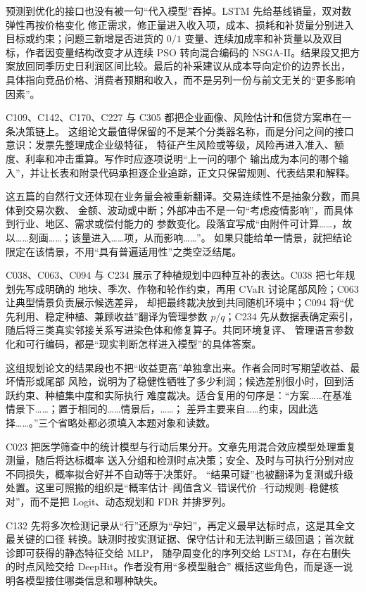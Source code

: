 \documentclass[UTF8,a4paper,12pt]{ctexart}
\begin{document}
预测到优化的接口也没有被一句“代入模型”吞掉。LSTM 先给基线销量，双对数弹性再按价格变化
修正需求，修正量进入收入项，成本、损耗和补货量分别进入目标或约束；问题三新增是否进货的
$0/1$ 变量、连续加成率和补货量以及双目标，作者因变量结构改变才从连续 PSO 转向混合编码的
NSGA-II。结果段又把方案放回同季历史日利润区间比较。最后的补采建议从成本导向定价的边界长出，
具体指向竞品价格、消费者预期和收入，而不是另列一份与前文无关的“更多影响因素”。

C109、C142、C170、C227 与 C305 都把企业画像、风险估计和信贷方案串在一条决策链上。
这组论文最值得保留的不是某个分类器名称，而是分问之间的接口意识：发票先整理成企业级特征，
特征产生风险或等级，风险再进入准入、额度、利率和冲击重算。写作时应逐项说明“上一问的哪个
输出成为本问的哪个输入”，并让长表和附录代码承担逐企业追踪，正文只保留规则、代表结果和解释。

这五篇的自然行文还体现在业务量会被重新翻译。交易连续性不是抽象分数，而具体到交易次数、
金额、波动或中断；外部冲击不是一句“考虑疫情影响”，而具体到行业、地区、需求或偿付能力的
参数变化。段落宜写成“由附件可计算……，故以……刻画……；该量进入……项，从而影响……”。
如果只能给单一情景，就把结论限定在该情景，不用“具有普遍适用性”之类空泛结尾。

C038、C063、C094 与 C234 展示了种植规划中四种互补的表达。C038 把七年规划先写成明确的
地块、季次、作物和轮作约束，再用 CVaR 讨论尾部风险；C063 让典型情景负责展示候选差异，
却把最终裁决放到共同随机环境中；C094 将“优先利用、稳定种植、兼顾收益”翻译为管理参数
$p/q$；C234 先从数据表确定索引，随后将三类真实邻接关系写进染色体和修复算子。共同环境复评、
管理语言参数化和可行编码，都是“现实判断怎样进入模型”的具体答案。

这组规划论文的结果段也不把“收益更高”单独拿出来。作者会同时写期望收益、最坏情形或尾部
风险，说明为了稳健性牺牲了多少利润；候选差别很小时，回到活跃约束、种植集中度和实际执行
难度裁决。适合复用的句序是：“方案……在基准情景下……；置于相同的……情景后，……；
差异主要来自……约束，因此选择……。”三个省略处都必须填入本题对象和读数。

C023 把医学筛查中的统计模型与行动后果分开。文章先用混合效应模型处理重复测量，随后将达标概率
送入分组和检测时点决策；安全、及时与可执行分别对应不同损失，概率拟合好并不自动等于决策好。
“结果可疑”也被翻译为复测或升级处置。这里可照搬的组织是“概率估计--阈值含义--错误代价
--行动规则--稳健核对”，而不是把 Logit、动态规划和 FDR 并排罗列。

C132 先将多次检测记录从“行”还原为“孕妇”，再定义最早达标时点，这是其全文最关键的口径
转换。缺测时按实测证据、保守估计和无法判断三级回退；首次就诊即可获得的静态特征交给 MLP，
随孕周变化的序列交给 LSTM，存在右删失的时点风险交给 DeepHit。作者没有用“多模型融合”
概括这些角色，而是逐一说明各模型接住哪类信息和哪种缺失。
\end{document}
